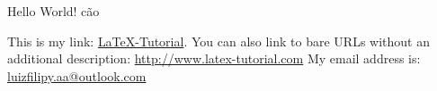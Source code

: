 \documentclass{book}
\begin{document}
Hello World!
cão

This is my link: \href{http://www.latex-tutorial.com}{LaTeX-Tutorial}.
You can also link to bare URLs without an additional description: \url{http://www.latex-tutorial.com}
My email address is: \href{mailto:luizfilipy.aa@outlook.com}{luizfilipy.aa@outlook.com}
\end{document}
